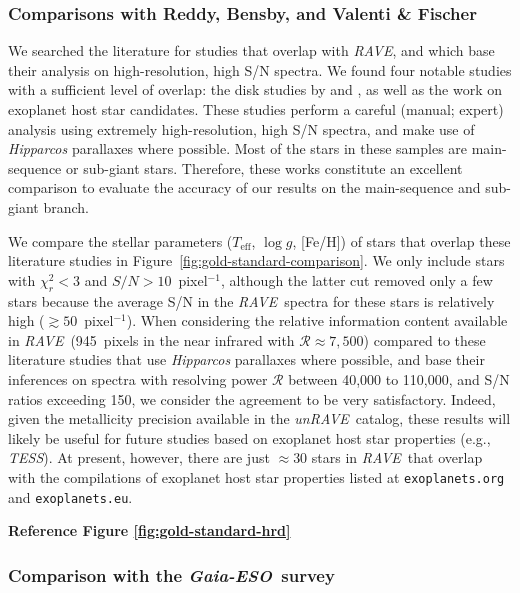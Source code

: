\documentclass[preprint,trackchanges]{aastex}
\newcommand{\acronym}[1]{{\small{#1}}}
\newcommand{\project}[1]{\textsl{#1}}
\newcommand{\rave}{\project{\acronym{RAVE}}}
\newcommand{\ges}{\project{Gaia-ESO}}
\newcommand{\unrave}{\project{unRAVE}}
\newcommand{\stub}[1]{{\color{blue} \textbf{#1}}}
\newcommand{\teff}{T_{\mathrm{eff}}}
\newcommand{\logg}{\log g}
\begin{document}
\subsubsection{Comparisons with Reddy, Bensby, and Valenti \& Fischer}
\label{sec:validation-gold-standards}

We searched the literature for studies that overlap with \rave, and which base
their analysis on high-resolution, high S/N spectra.  We found four notable
studies with a sufficient level of overlap: the disk studies by \citet{Reddy_2003,Reddy_2006}
and \citet{Bensby_2014}, as well as the \citet{Valenti_Fischer_2005} work on exoplanet
host star candidates.  These studies 
perform a careful (manual; expert) analysis using extremely high-resolution, high S/N spectra, and make use of \project{Hipparcos}
parallaxes where possible.  Most of the stars in these samples are main-sequence
or sub-giant stars.  Therefore, these works constitute an excellent comparison
to evaluate the accuracy of our results on the main-sequence and sub-giant branch.


We compare the stellar parameters ($\teff$, $\logg$, [Fe/H]) of stars that
overlap these literature studies in Figure~\ref{fig:gold-standard-comparison}.
We only include stars with $\chi_r^2 < 3$ and $S/N > 10$~pixel$^{-1}$, although the latter
cut removed only a few stars because the average S/N in the \rave\ spectra for
these stars is relatively high ($\gtrsim{}50$~pixel$^{-1}$). When considering the relative 
information content available in \rave\ (945~pixels in the near infrared with
$\mathcal{R} \approx 7{,}500$) compared to these literature studies that use
\project{Hipparcos} parallaxes where possible, and base their inferences on
spectra with resolving power $\mathcal{R}$ between 40,000 to 110,000, and
S/N ratios exceeding 150, we consider the agreement to be very satisfactory.
Indeed, given the metallicity precision available in the \unrave\ catalog, 
these results will likely be useful for future studies based on exoplanet
host star properties (e.g., \project{TESS}). At present, however, there are 
just $\approx$30 stars in \rave\ that overlap with the compilations of 
exoplanet host star properties listed at \texttt{exoplanets.org} and 
\texttt{exoplanets.eu}.


\stub{Reference Figure \ref{fig:gold-standard-hrd}}


\subsubsection{Comparison with the \ges\ survey}
\label{sec:validation-ges}
\end{document}
